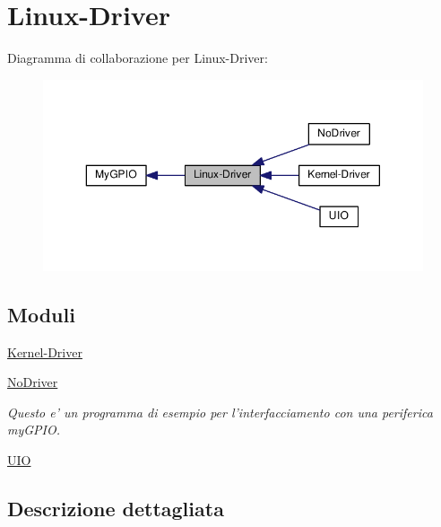 \hypertarget{group___linux-_driver}{\section{Linux-\/\+Driver}
\label{group___linux-_driver}
}
Diagramma di collaborazione per Linux-\/\+Driver\+:\nopagebreak
\begin{figure}[H]
\begin{center}
\leavevmode
\includegraphics[width=350pt]{group___linux-_driver}
\end{center}
\end{figure}
\subsection*{Moduli}
\begin{DoxyCompactItemize}
\item 
\hyperlink{group___kernel-_driver}{Kernel-\/\+Driver}
\item 
\hyperlink{group___no_driver}{No\+Driver}
\begin{DoxyCompactList}\small\item\em Questo e' un programma di esempio per l'interfacciamento con una periferica my\+G\+P\+I\+O. \end{DoxyCompactList}\item 
\hyperlink{group___u_i_o}{U\+I\+O}
\end{DoxyCompactItemize}


\subsection{Descrizione dettagliata}
